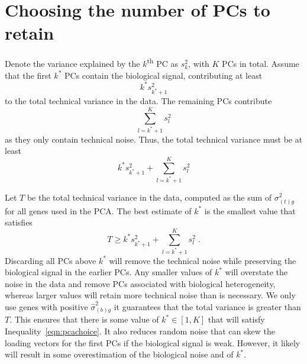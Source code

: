 \documentclass{article}
\begin{document}

\section{Choosing the number of PCs to retain}
Denote the variance explained by the $k$\textsuperscript{th} PC as $s^2_k$, with $K$ PCs in total.
Assume that the first $k^*$ PCs contain the biological signal, contributing at least
\[
    k^* s^2_{k^*+1}
\]
to the total technical variance in the data. 
The remaining PCs contribute
\[
    \sum_{l=k^*+1}^K s^2_l 
\]
as they only contain technical noise.
Thus, the total technical variance must be at least
\[
    k^* s^2_{k^*+1} + \sum_{l=k^*+1}^K s^2_l 
\]

Let $T$ be the total technical variance in the data, computed as the sum of $\sigma^2_{(t)g}$ for all genes used in the PCA.
The best estimate of $k^*$ is the smallest value that satisfies 
\begin{equation}
    T \ge k^* s^2_{k^*+1} + \sum_{l=k^*+1}^K s^2_l  \label{eqn:pcachoice} \;.
\end{equation}
Discarding all PCs above $k^*$ will remove the technical noise while preserving the biological signal in the earlier PCs.
Any smaller values of $k^*$ will overstate the noise in the data and remove PCs associated with biological heterogeneity,
whereas larger values will retain more technical noise than is necessary. 
We only use genes with positive $\hat\sigma^2_{(b)g}$ it guarantees that the total variance is greater than $T$.
This ensures that there is some value of $k^* \in [1, K]$ that will satisfy Inequality~\ref{eqn:pcachoice}.
It also reduces random noise that can skew the loading vectors for the first PCs if the biological signal is weak.
However, it likely will result in some overestimation of the biological noise and of $k^*$.
\end{document}
